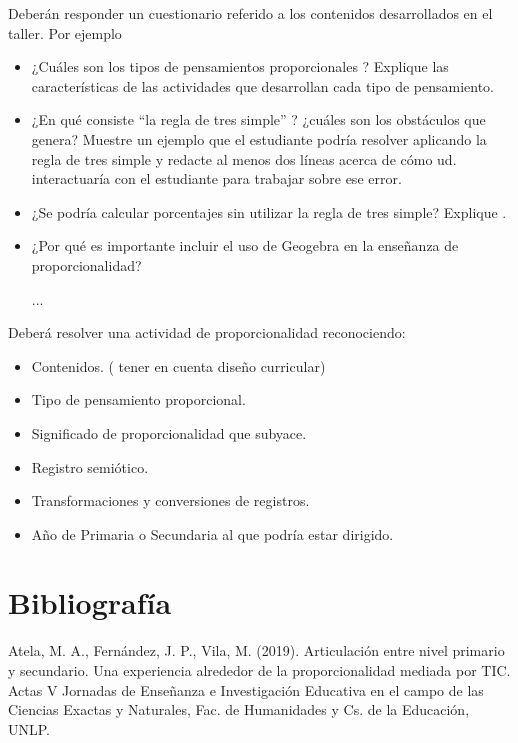 \documentclass[oneside,spanish]{amsart}
\numberwithin{equation}{section}
\numberwithin{figure}{section}
\begin{document}
\begin{description}[itemsep=10pt]
    \item[Actividad 1] Deberán responder un cuestionario referido a los contenidos desarrollados en el taller.
    Por ejemplo
    \begin{itemize}[itemsep=10pt]
        \item ¿Cuáles son los tipos de pensamientos proporcionales ? Explique las características de las actividades que desarrollan cada tipo de pensamiento.
        \item ¿En qué consiste “la regla de tres simple” ? ¿cuáles son los obstáculos que genera? Muestre un ejemplo que el estudiante podría resolver aplicando la regla  de tres simple y redacte al menos dos líneas acerca de cómo ud. interactuaría con el estudiante para trabajar sobre ese error.
        \item ¿Se podría calcular porcentajes sin utilizar la regla de tres simple? Explique .
        \item ¿Por qué es importante incluir el uso de Geogebra en la enseñanza de proporcionalidad?

        ...
    \end{itemize}

    \item[Actividad 2]Deberá resolver una actividad de proporcionalidad reconociendo:

    \begin{itemize}[itemsep=10pt]
        \item Contenidos. ( tener en cuenta diseño curricular)
        \item Tipo de pensamiento proporcional.
        \item Significado de proporcionalidad que subyace.
        \item Registro semiótico.
        \item Transformaciones y conversiones de registros.
        \item Año de Primaria o Secundaria al que podría estar dirigido.        
    \end{itemize}

\end{description} 
\section{Bibliografía}

Atela,  M.  A.,  Fernández,  J.  P.,  Vila,  M.  (2019).  Articulación  entre  nivel primario    y    secundario.    Una    experiencia    alrededor    de    la proporcionalidad mediada por TIC. Actas V Jornadas de Enseñanza e Investigación  Educativa  en  el  campo  de  las  Ciencias  Exactas  y Naturales, Fac. de Humanidades y Cs. de la Educación, UNLP.\\
\end{document}
